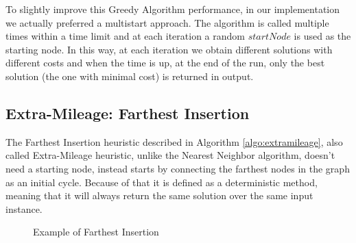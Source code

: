 To slightly improve this Greedy Algorithm performance, in our implementation we actually preferred a multistart approach. The algorithm is called multiple times within a time limit and at each iteration a random $startNode$ is used as the starting node. In this way, at each iteration we obtain different solutions with different costs and when the time is up, at the end of the run, only the best solution (the one with minimal cost) is returned in output.



\subsection{Extra-Mileage: Farthest Insertion}\label{extramileage}
The Farthest Insertion heuristic described in Algorithm \ref{algo:extramileage}, also called Extra-Mileage heuristic, unlike the Nearest Neighbor algorithm, doesn’t need a starting node, instead starts by connecting the farthest nodes in the graph as an initial cycle. Because of that it is defined as a deterministic method, meaning that it will always return the same solution over the same input instance.

\begin{figure}[!h]
    \centering
    \caption{Example of Farthest Insertion} \label{fig:extra}
\end{figure}

